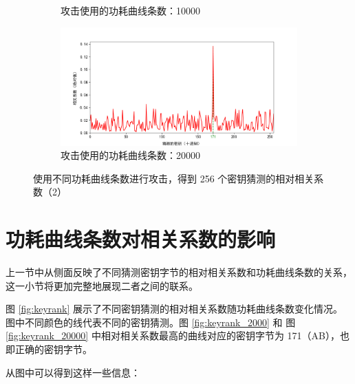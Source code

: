 \begin{figure}[htbp]
\begin{subfigure}{1.0\textwidth}
        \caption{攻击使用的功耗曲线条数：10000}
    \end{subfigure}
    \begin{subfigure}{1.0\textwidth}
        \includegraphics[height=.21\textheight, width=1.0\textwidth]{../images/keyguess_20000.png}
        \caption{攻击使用的功耗曲线条数：20000}
    \end{subfigure}

    \caption{使用不同功耗曲线条数进行攻击，得到 256 个密钥猜测的相对相关系数（2）}
\end{figure}

\newpage

\section{功耗曲线条数对相关系数的影响}

上一节中从侧面反映了不同猜测密钥字节的相对相关系数和功耗曲线条数的关系，这一小节将更加完整地展现二者之间的联系。

\vspace*{\baselineskip}

图 \ref{fig:keyrank} 展示了不同密钥猜测的相对相关系数随功耗曲线条数变化情况。图中不同颜色的线代表不同的密钥猜测。图 \ref{fig:keyrank_2000} 和 图 \ref{fig:keyrank_20000} 中相对相关系数最高的曲线对应的密钥字节为 171（AB），也即正确的密钥字节。

从图中可以得到这样一些信息：

